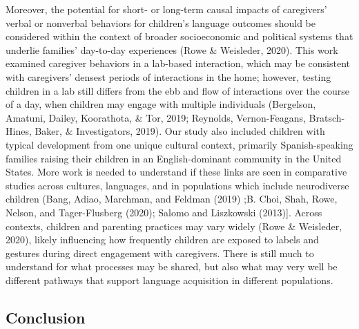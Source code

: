 \documentclass[
  man,mask,floatsintext]{apa6}
\begin{document}
Moreover, the potential for short- or long-term causal impacts of caregivers' verbal or nonverbal behaviors for children's language outcomes should be considered within the context of broader socioeconomic and political systems that underlie families' day-to-day experiences (Rowe \& Weisleder, 2020). This work examined caregiver behaviors in a lab-based interaction, which may be consistent with caregivers' densest periods of interactions in the home; however, testing children in a lab still differs from the ebb and flow of interactions over the course of a day, when children may engage with multiple individuals (Bergelson, Amatuni, Dailey, Koorathota, \& Tor, 2019; Reynolds, Vernon-Feagans, Bratsch-Hines, Baker, \& Investigators, 2019). Our study also included children with typical development from one unique cultural context, primarily Spanish-speaking families raising their children in an English-dominant community in the United States. More work is needed to understand if these links are seen in comparative studies across cultures, languages, and in populations which include neurodiverse children (Bang, Adiao, Marchman, and Feldman (2019) ;B. Choi, Shah, Rowe, Nelson, and Tager-Flusberg (2020); Salomo and Liszkowski (2013){]}. Across contexts, children and parenting practices may vary widely (Rowe \& Weisleder, 2020), likely influencing how frequently children are exposed to labels and gestures during direct engagement with caregivers. There is still much to understand for what processes may be shared, but also what may very well be different pathways that support language acquisition in different populations.

\hypertarget{conclusion}{%
\subsection{Conclusion}\label{conclusion}}
\end{document}
